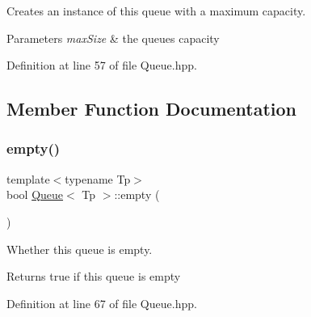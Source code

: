 Creates an instance of this queue with a maximum capacity.


\begin{DoxyParams}{Parameters}
{\em max\+Size} & the queue\textquotesingle{}s capacity \\
\hline
\end{DoxyParams}


Definition at line 57 of file Queue.\+hpp.


\begin{DoxyCode}{0}

\end{DoxyCode}


\subsection{Member Function Documentation}
\mbox{\label{classQueue_af332726c4f0882923eb8c1466d6f7b2c}} 
\subsubsection{\texorpdfstring{empty()}{empty()}}
{\footnotesize\ttfamily template$<$typename Tp$>$ \\
bool \mbox{\hyperlink{classQueue}{Queue}}$<$ Tp $>$\+::empty (\begin{DoxyParamCaption}{ }\end{DoxyParamCaption})\hspace{0.3cm}{\ttfamily [inline]}}

Whether this queue is empty.

\begin{DoxyReturn}{Returns}
true if this queue is empty 
\end{DoxyReturn}


Definition at line 67 of file Queue.\+hpp.


\begin{DoxyCode}{0}

\end{DoxyCode}
\mbox{\label{classQueue_a481598ed9c07d23c00ce3648c148415d}} 
